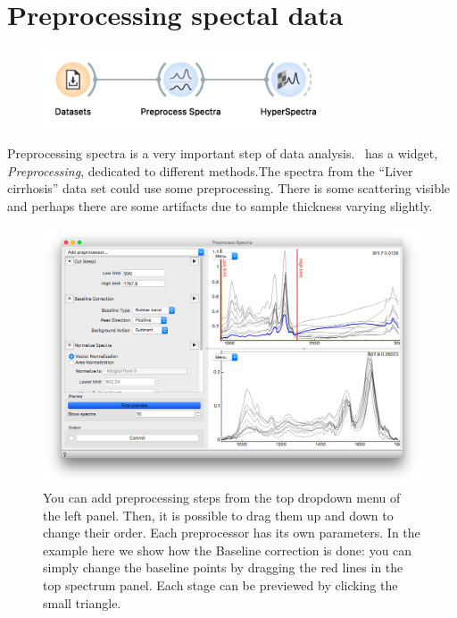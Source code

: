 \chapter{Preprocessing spectal data}
\label{ch:spectral_preprocessing}


\begin{figure}
    \centering
    \vspace{-3.4cm}
    \includegraphics[width=0.75\textwidth]{graphics/ch-spectral_preprocessing/spectral_preprocessing-fig1.png}
    \label{fig:spectral_preprocessing-fig1}
\end{figure}

Preprocessing spectra is a very important step of data analysis. \mutation\ has a widget, \textit{Preprocessing}, dedicated to different methods.The spectra from the “Liver cirrhosis” data set could use some preprocessing. There is some scattering visible and perhaps there are some artifacts due to sample thickness varying slightly.

\begin{figure}[h]
    \centering
    \includegraphics[width=\textwidth]{graphics/ch-spectral_preprocessing/spectral_preprocessing-fig2.png}
    \caption{You can add preprocessing steps from the top dropdown menu of the left panel. Then, it is possible to drag them up and down to change their order. Each preprocessor has its own parameters. In the example here we show how the Baseline correction is done: you can simply change the baseline points by dragging the red lines in the top spectrum panel. Each stage can be previewed by clicking the small triangle.}
    \label{fig:spectral_preprocessing-fig2}
\end{figure}

